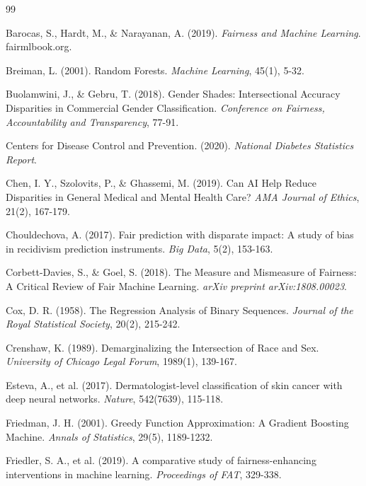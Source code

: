 \documentclass[12pt,a4paper]{article}
\begin{document}
\begin{thebibliography}{99}

Barocas, S., Hardt, M., \& Narayanan, A. (2019). \textit{Fairness and 
Machine Learning}. fairmlbook.org.

Breiman, L. (2001). Random Forests. \textit{Machine Learning}, 45(1), 5-32.

Buolamwini, J., \& Gebru, T. (2018). Gender Shades: Intersectional Accuracy 
Disparities in Commercial Gender Classification. \textit{Conference on Fairness, 
Accountability and Transparency}, 77-91.

Centers for Disease Control and Prevention. (2020). \textit{National Diabetes 
Statistics Report}.

Chen, I. Y., Szolovits, P., \& Ghassemi, M. (2019). Can AI Help Reduce 
Disparities in General Medical and Mental Health Care? \textit{AMA Journal 
of Ethics}, 21(2), 167-179.

Chouldechova, A. (2017). Fair prediction with disparate impact: A study of 
bias in recidivism prediction instruments. \textit{Big Data}, 5(2), 153-163.

Corbett-Davies, S., \& Goel, S. (2018). The Measure and Mismeasure of 
Fairness: A Critical Review of Fair Machine Learning. \textit{arXiv preprint 
arXiv:1808.00023}.

Cox, D. R. (1958). The Regression Analysis of Binary Sequences. \textit{Journal 
of the Royal Statistical Society}, 20(2), 215-242.

Crenshaw, K. (1989). Demarginalizing the Intersection of Race and Sex. 
\textit{University of Chicago Legal Forum}, 1989(1), 139-167.

Esteva, A., et al. (2017). Dermatologist-level classification of skin cancer 
with deep neural networks. \textit{Nature}, 542(7639), 115-118.

Friedman, J. H. (2001). Greedy Function Approximation: A Gradient Boosting 
Machine. \textit{Annals of Statistics}, 29(5), 1189-1232.

Friedler, S. A., et al. (2019). A comparative study of fairness-enhancing 
interventions in machine learning. \textit{Proceedings of FAT}, 329-338.


\end{thebibliography}
\end{document}
